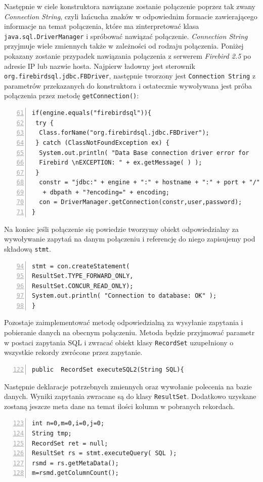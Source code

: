 Następnie w ciele konstruktora nawiązane zostanie połączenie poprzez  tak zwany \emph{Connection String}, czyli łańcucha znaków w odpowiednim formacie zawierającego informacje na temat połączenia, które ma zinterpretować klasa \texttt{java.sql.DriverManager} i spróbować nawiązać połączenie. \emph{Connection String} przyjmuje wiele zmiennych także w zależności od rodzaju połączenia. Poniżej pokazany zostanie przypadek nawiązania połączenia z serwerem \emph{Firebird 2.5} po adresie IP lub nazwie hosta. Najpierw ładowny jest sterownik \texttt{org.firebirdsql.jdbc.FBDriver}, następnie tworzony jest \texttt{Connection String} z parametrów przekazanych do konstruktora i ostatecznie wywoływana jest próba połączenia przez metodę \texttt{getConnection()}:
   \begin{lstlisting}[numbers=left,firstnumber=61]
if(engine.equals("firebirdsql")){
 try {
  Class.forName("org.firebirdsql.jdbc.FBDriver");
 } catch (ClassNotFoundException ex) {
  System.out.println( "Data Base connection driver error for 
  Firebird \nEXCEPTION: " + ex.getMessage( ) );
 }
  constr = "jdbc:" + engine + ":" + hostname + ":" + port + "/"
   + dbpath + "?encoding=" + encoding;
  con = DriverManager.getConnection(constr,user,password);
}
\end{lstlisting}

Na koniec jeśli połączenie się powiedzie tworzymy obiekt odpowiedzialny za wywoływanie zapytań na danym połączeniu i referencję do niego zapisujemy pod składową \texttt{stmt}.
\begin{lstlisting}[numbers=left,firstnumber=94]
stmt = con.createStatement(
ResultSet.TYPE_FORWARD_ONLY,
ResultSet.CONCUR_READ_ONLY);
System.out.println( "Connection to database: OK" );
}
\end{lstlisting}

Pozostaje zaimplementować metodę odpowiedzialną za wysyłanie zapytania i pobieranie danych na obecnym połączeniu. Metoda będzie przyjmować parametr w postaci zapytania SQL i zwracać obiekt klasy \texttt{RecordSet} uzupełniony o wszystkie rekordy zwrócone przez zapytanie.
\begin{lstlisting}[numbers=left,firstnumber=122]
public  RecordSet executeSQL2(String SQL){
\end{lstlisting}

Następnie deklaracje potrzebnych zmiennych oraz wywołanie polecenia na bazie danych. Wyniki zapytania zwracane są do klasy \texttt{ResultSet}. Dodatkowo uzyskane zostaną jeszcze meta dane na temat ilości kolumn w pobranych rekordach. 
\begin{lstlisting}[numbers=left,firstnumber=123]
int n=0,m=0,i=0,j=0;
String tmp;
RecordSet ret = null;
ResultSet rs = stmt.executeQuery( SQL );
rsmd = rs.getMetaData();
m=rsmd.getColumnCount();
\end{lstlisting}

